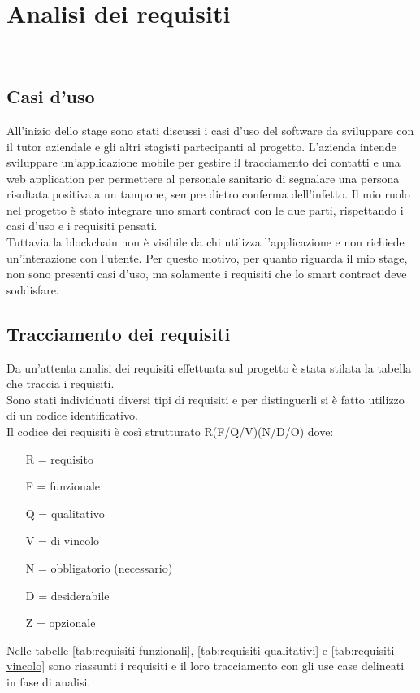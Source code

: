 
\chapter{Analisi dei requisiti}
\label{cap:analisi-requisiti}

\\

\section{Casi d'uso}
All'inizio dello stage sono stati discussi i casi d'uso del software da sviluppare con il tutor aziendale e gli altri stagisti partecipanti al progetto.
L'azienda intende sviluppare un'applicazione mobile per gestire il tracciamento dei contatti e una web application per permettere al personale sanitario di segnalare una persona risultata positiva a un tampone, sempre dietro conferma dell'infetto. Il mio ruolo nel progetto è stato integrare uno smart contract con le due parti, rispettando i casi d'uso e i requisiti pensati.\\
Tuttavia la blockchain non è visibile da chi utilizza l'applicazione e non richiede un'interazione con l'utente. Per questo motivo, per quanto riguarda il mio stage, non sono presenti casi d'uso, ma solamente i requisiti che lo smart contract deve soddisfare.
\section{Tracciamento dei requisiti}

Da un'attenta analisi dei requisiti effettuata sul progetto è stata stilata la tabella che traccia i requisiti.\\
Sono stati individuati diversi tipi di requisiti e per distinguerli si è fatto utilizzo di un codice identificativo.\\
Il codice dei requisiti è così strutturato R(F/Q/V)(N/D/O) dove:
\begin{enumerate}
	\item[R =] requisito
    \item[F =] funzionale
    \item[Q =] qualitativo
    \item[V =] di vincolo
    \item[N =] obbligatorio (necessario)
    \item[D =] desiderabile
    \item[Z =] opzionale
\end{enumerate}
Nelle tabelle \ref{tab:requisiti-funzionali}, \ref{tab:requisiti-qualitativi} e \ref{tab:requisiti-vincolo} sono riassunti i requisiti e il loro tracciamento con gli use case delineati in fase di analisi.

